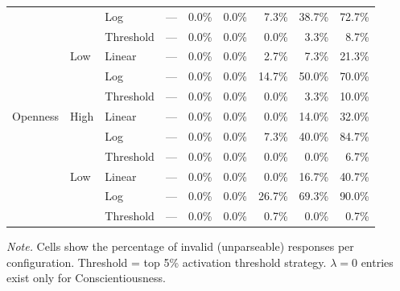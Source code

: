 \begin{table}[htbp]
\begin{threeparttable}
\begin{tabular}{lllrrrrrr}
   &  & Log & — & 0.0\% & 0.0\% & 7.3\% & 38.7\% & 72.7\% \\
   &  & Threshold & — & 0.0\% & 0.0\% & 0.0\% & 3.3\% & 8.7\% \\
   & Low & Linear & — & 0.0\% & 0.0\% & 2.7\% & 7.3\% & 21.3\% \\
   &  & Log & — & 0.0\% & 0.0\% & 14.7\% & 50.0\% & 70.0\% \\
   &  & Threshold & — & 0.0\% & 0.0\% & 0.0\% & 3.3\% & 10.0\% \\
\addlinespace
  Openness & High & Linear & — & 0.0\% & 0.0\% & 0.0\% & 14.0\% & 32.0\% \\
   &  & Log & — & 0.0\% & 0.0\% & 7.3\% & 40.0\% & 84.7\% \\
   &  & Threshold & — & 0.0\% & 0.0\% & 0.0\% & 0.0\% & 6.7\% \\
   & Low & Linear & — & 0.0\% & 0.0\% & 0.0\% & 16.7\% & 40.7\% \\
   &  & Log & — & 0.0\% & 0.0\% & 26.7\% & 69.3\% & 90.0\% \\
   &  & Threshold & — & 0.0\% & 0.0\% & 0.7\% & 0.0\% & 0.7\% \\
\bottomrule
\end{tabular}
\begin{tablenotes}
\scriptsize
\item \textit{Note.} Cells show the percentage of invalid (unparseable) responses per configuration. Threshold = top 5\% activation threshold strategy. $\lambda = 0$ entries exist only for Conscientiousness.
\end{tablenotes}
\end{threeparttable}
\end{table}